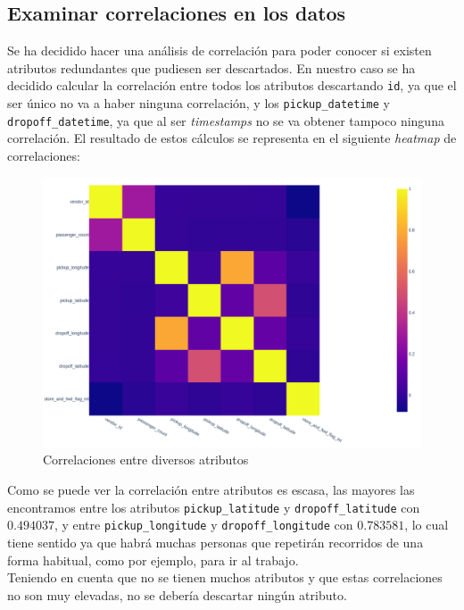 \documentclass[12pt]{article}
\begin{document}
\subsection{Examinar correlaciones en los datos}

Se ha decidido hacer una análisis de correlación para poder conocer si existen atributos redundantes que pudiesen ser descartados. En nuestro caso se ha decidido calcular la correlación entre todos los atributos descartando \texttt{id}, ya que el ser único no va a haber ninguna correlación, y los \texttt{pickup\_datetime} y \texttt{dropoff\_datetime}, ya que al ser \textit{timestamps} no se va obtener tampoco ninguna correlación. El resultado de estos cálculos se representa en el siguiente \textit{heatmap} de correlaciones:

\begin{figure}[H]
    \centering
    \includegraphics[width=1.0\textwidth]{correlaciones.PNG}
    \caption{Correlaciones entre diversos atributos}
    \label{fig:correlaciones}
\end{figure}

Como se puede ver la correlación entre atributos es escasa, las mayores las encontramos entre los atributos \texttt{pickup\_latitude} y \texttt{dropoff\_latitude} con $0.494037$, y entre \texttt{pickup\_longitude} y \texttt{dropoff\_longitude} con $0.783581$, lo cual tiene sentido ya que habrá muchas personas que repetirán recorridos de una forma habitual, como por ejemplo, para ir al trabajo.\\

Teniendo en cuenta que no se tienen muchos atributos y que estas correlaciones no son muy elevadas, no se debería descartar ningún atributo.
\end{document}
